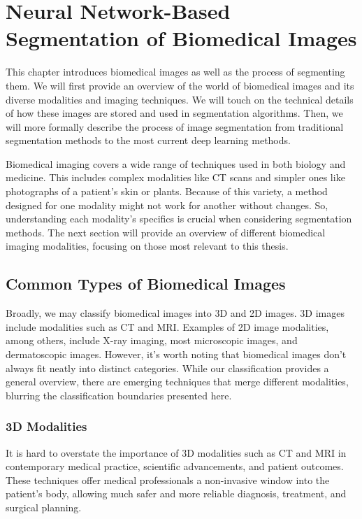\chapter{Neural Network-Based Segmentation of Biomedical Images}
\label{chap:seg-background}

This chapter introduces biomedical images as well as the process of segmenting them. We will first provide an overview of the world of biomedical images and its diverse modalities and imaging techniques. We will touch on the technical details of how these images are stored and used in segmentation algorithms. Then, we will more formally describe the process of image segmentation from traditional segmentation methods to the most current deep learning methods.

Biomedical imaging covers a wide range of techniques used in both biology and medicine. This includes complex modalities like CT scans and simpler ones like photographs of a patient's skin or plants. Because of this variety, a method designed for one modality might not work for another without changes. So, understanding each modality's specifics is crucial when considering segmentation methods. The next section will provide an overview of different biomedical imaging modalities, focusing on those most relevant to this thesis.

\section{Common Types of Biomedical Images}

Broadly, we may classify biomedical images into 3D and 2D images. 3D images include modalities such as CT and MRI. Examples of 2D image modalities, among others, include X-ray imaging, most microscopic images, and dermatoscopic images. However, it's worth noting that biomedical images don't always fit neatly into distinct categories. While our classification provides a general overview, there are emerging techniques that merge different modalities, blurring the classification boundaries presented here.

\subsection{3D Modalities}

It is hard to overstate the importance of 3D modalities such as CT and MRI in contemporary medical practice, scientific advancements, and patient outcomes. These techniques offer medical professionals a non-invasive window into the patient's body, allowing much safer and more reliable diagnosis, treatment, and surgical planning. 

